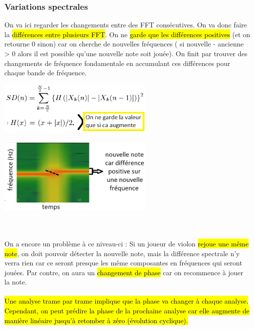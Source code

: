 \documentclass[letterpaper, 12pt]{article}
\newcommand{\alinea}{
\hspace*{0.5cm}}
\begin{document}
			\subsubsection{Variations spectrales}
				\alinea On va ici regarder les changements entre des FFT consécutives. On va donc faire la \hl{différences entre plusieurs
					FFT}. On ne \hl{garde que les différences positives} (et on retourne 0 sinon) car on cherche de nouvelles fréquences 
					( si nouvelle - ancienne > 0 alors il est possible qu'une nouvelle note soit jouée). On finit par trouver des 
					changements de fréquence fondamentale en accumulant ces différences pour chaque bande de fréquence.\\
				\begin{minipage}{0.49\textwidth}
					\includegraphics[width=3in]{Images/spectral-eq}
				\end{minipage} \hfill
				\begin{minipage}{0.49\textwidth}
					\includegraphics[width=3in]{Images/spectral}
				\end{minipage}~\\~\\
				\alinea On a encore un problème à ce niveau-ci : Si un joueur de violon \hl{rejoue une même note}, on doit pouvoir détecter
					la nouvelle note, mais la différence spectrale n'y verra rien car ce seront presque les même composantes en fréquences 
					qui seront jouées. Par contre, on aura un \hl{changement de phase} car on recommence à jouer la note.\\
				~\\			
				\alinea \hl{Une analyse trame par trame implique que la phase va changer à chaque analyse. Cependant, on peut prédire la phase
					de la prochaine analyse car elle augmente de manière linéaire jusqu'à retomber à zéro (évolution cyclique).}
\end{document}
